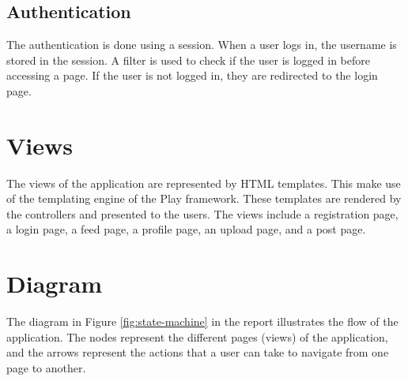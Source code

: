 \documentclass{article}
\begin{document}
    \subsection{Authentication}
    The authentication is done using a session.
    When a user logs in, the username is stored in the session.
    A filter is used to check if the user is logged in before accessing a page.
    If the user is not logged in, they are redirected to the login page.


    \section{Views}
    The views of the application are represented by HTML templates.
    This make use of the templating engine of the Play framework.
    These templates are rendered by the controllers and presented to the users.
    The views include a registration page, a login page, a feed page, a profile page, an upload page, and a post page.


    \section{Diagram}
    The diagram in Figure \ref{fig:state-machine} in the report illustrates the flow of the application.
    The nodes represent the different pages (views) of the application, and the arrows represent the actions that a user can take to navigate from one page to another.
\end{document}

